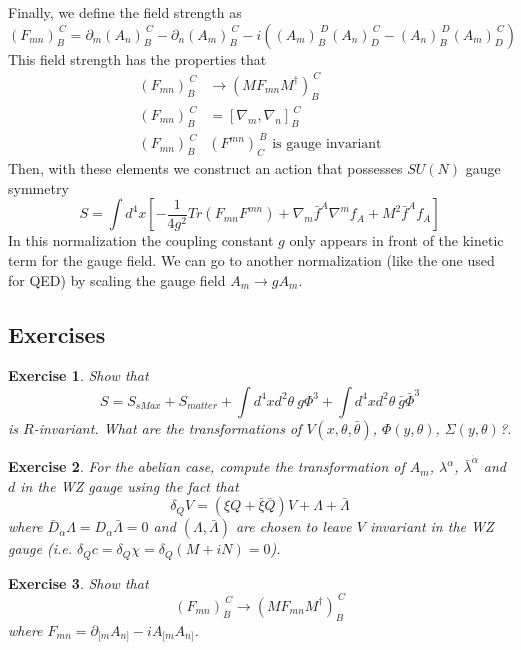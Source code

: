 \documentclass[a4paper,12pt]{article}
\newtheorem{exe}{Exercise}
\numberwithin{equation}{section}
\numberwithin{exe}{section}
\renewcommand{\dag}{{\dagger}}
\newcommand{\p}{{\partial}}
\newcommand{\Qb}{{\bar Q}}
\newcommand{\Db}{{\bar D}}
\newcommand{\N}{{\nabla}}
\renewcommand{\a}{{\alpha}}
\newcommand{\ad}{{\dot\alpha}}
\renewcommand{\d}{{\delta}}
\renewcommand{\l}{{\lambda}}
\newcommand{\lb}{{\bar\lambda}}
\renewcommand{\S}{{\Sigma}}
\renewcommand{\t}{{\theta}}
\newcommand{\tb}{{\bar\theta}}
\newcommand{\xib}{{\bar\xi}}
\newcommand{\Phib}{{\bar \Phi}}
\begin{document}
Finally, we define the field strength as
	\begin{equation}
	(F_{mn})_B^{\ C} = \p_m(A_n)_B^{\ C} - \p_n(A_m)_B^{\ C} - i\left( (A_m)_B^{\ D} (A_n)_D^{\ C} - (A_n)_B^{\ D} (A_m)_D^{\ C} \right)
	\end{equation}
	This field strength has the properties that
	\begin{align}
	(F_{mn})_B^{\ C} & \rightarrow (M F_{mn} M^\dagger)_B^{\ C} \\
	(F_{mn})_B^{\ C} & = [\N_m, \N_n]_B^{\ C} \\
	(F_{mn})_B^{\ C} &(F^{mn})_C^{\ B}\text{ is gauge invariant}
	\end{align}
Then, with these elements we construct an action that possesses $SU(N)$ gauge symmetry
	\begin{equation}
	S = \int d^4x [ -\frac{1}{4g^2}Tr(F_{mn} F^{mn}) + \N_m\bar f^A \N^m f_A + M^2 \bar f^A f_A ]
	\end{equation}
In this normalization the coupling constant $g$ only appears in front of the kinetic term for the gauge field. We can go to another normalization (like the one used for QED) by scaling the gauge field $A_m \rightarrow g A_m$.

\subsection{Exercises}

	\begin{exe}
	Show that
		\begin{equation}
		S = S_{sMax} + S_{matter} + \int d^4 x d^2\t\ g\Phi^3 + \int d^4 x d^2\t\ \bar g \Phib^3
		\end{equation}
	is $R$-invariant. What are the transformations of $V(x,\t,\tb)$, $\Phi(y,\t)$, $\S(y,\t)$?.
	\end{exe}

	\begin{exe}
	For the abelian case, compute the transformation of $A_m$, $\l^\a$, $\lb^\ad$ and $d$ in the WZ gauge using the fact that
		\begin{equation}
		\d_Q V = (\xi Q + \xib \Qb) V + \Lambda + \bar\Lambda 
		\end{equation}
	where $\Db_\ad \Lambda = D_\a \bar\Lambda = 0$ and $(\Lambda, \bar\Lambda)$ are chosen to leave $V$ invariant in the WZ gauge (i.e. $\d_Q c = \d_Q \chi = \d_Q(M+iN) = 0$).
	\end{exe}

	\begin{exe}
	Show that
		\begin{equation}
		(F_{mn})_B^{\ C}\longrightarrow (M F_{mn} M^\dag)_B^{\ C}
		\end{equation}
	where $F_{mn} = \p_{[m}A_{n]} - i A_{[m} A_{n]}$.
	\end{exe}
\end{document}
